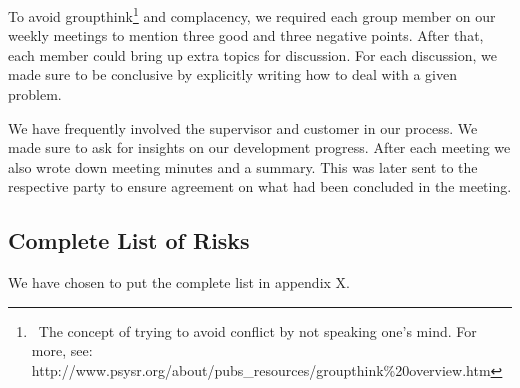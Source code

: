 To avoid groupthink\footnote{\ The concept of trying to avoid conflict
by not speaking one's mind. For more, see:
http://www.psysr.org/about/pubs\_resources/groupthink\%20overview.htm}
and complacency, we required each group member on our weekly meetings
to mention three good and three negative points. After that, each
member could bring up extra topics for discussion. For each discussion,
we made sure to be conclusive by explicitly writing how to deal with a
given problem. 

We have frequently involved the supervisor and customer in our process.
We made sure to ask for insights on our development progress. After
each meeting we also wrote down meeting minutes and a summary. This was
later sent to the respective party to ensure agreement on what had been
concluded in the meeting.

\subsection{Complete List of Risks}
We have chosen to put the complete list in appendix X.
